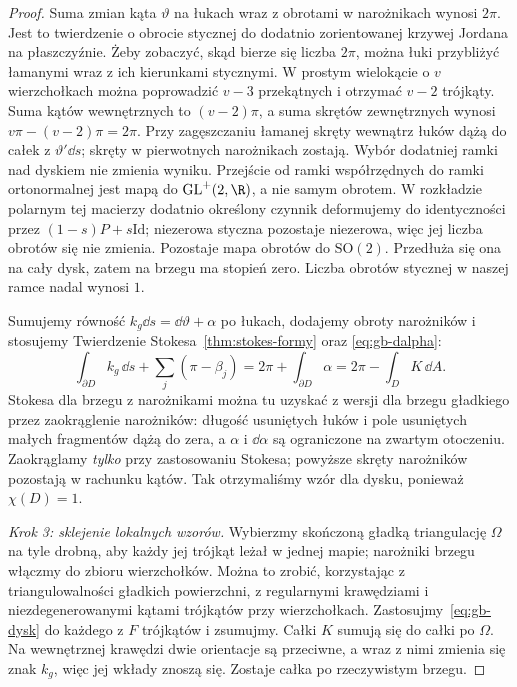 \begin{proof}
Suma zmian kąta $\vartheta$ na łukach wraz z obrotami
w narożnikach wynosi $2\pi$. Jest to twierdzenie o
obrocie stycznej do dodatnio zorientowanej krzywej
Jordana na płaszczyźnie. Żeby zobaczyć, skąd bierze się
liczba $2\pi$, można łuki przybliżyć łamanymi wraz z
ich kierunkami stycznymi. W prostym wielokącie o $v$
wierzchołkach można poprowadzić $v-3$ przekątnych
i otrzymać $v-2$ trójkąty. Suma kątów wewnętrznych
to $(v-2)\pi$, a suma skrętów zewnętrznych wynosi
$v\pi-(v-2)\pi=2\pi$. Przy zagęszczaniu łamanej skręty
wewnątrz łuków dążą do całek z $\vartheta'\dd s$;
skręty w pierwotnych narożnikach zostają. Wybór
dodatniej ramki nad dyskiem nie zmienia wyniku. Przejście
od ramki współrzędnych do ramki ortonormalnej jest mapą
do $\mathrm{GL}^+(2,\R)$, a nie samym obrotem. W rozkładzie
polarnym tej macierzy dodatnio określony czynnik deformujemy
do identyczności przez $(1-s)P+s\mathrm{Id}$; niezerowa
styczna pozostaje niezerowa, więc jej liczba obrotów się
nie zmienia. Pozostaje mapa obrotów do $\mathrm{SO}(2)$.
Przedłuża się ona na cały dysk, zatem na brzegu ma stopień
zero. Liczba obrotów stycznej w naszej ramce nadal wynosi $1$.

Sumujemy równość $k_g\dd s=\dd\vartheta+\alpha$
po łukach, dodajemy obroty narożników i stosujemy
Twierdzenie Stokesa~\ref{thm:stokes-formy} oraz
\eqref{eq:gb-dalpha}:
\begin{equation}\label{eq:gb-dysk}
 \int_{\partial D}k_g\,\dd s
 +\sum_j(\pi-\beta_j)
 =2\pi+\int_{\partial D}\alpha
 =2\pi-\int_D K\,\dd A.
\end{equation}
Stokesa dla brzegu z narożnikami można tu uzyskać
z wersji dla brzegu gładkiego przez zaokrąglenie
narożników: długość usuniętych łuków i pole usuniętych
małych fragmentów dążą do zera, a $\alpha$ i $\dd\alpha$
są ograniczone na zwartym otoczeniu. Zaokrąglamy
\emph{tylko} przy zastosowaniu Stokesa; powyższe
skręty narożników pozostają w rachunku kątów.
Tak otrzymaliśmy wzór dla dysku, ponieważ $\chi(D)=1$.

\emph{Krok 3: sklejenie lokalnych wzorów.}
Wybierzmy skończoną gładką triangulację $\Omega$ na tyle
drobną, aby każdy jej trójkąt leżał w jednej mapie;
narożniki brzegu włączmy do zbioru wierzchołków.
Można to zrobić, korzystając z triangulowalności
gładkich powierzchni, z regularnymi krawędziami i
niezdegenerowanymi kątami trójkątów przy wierzchołkach. Zastosujmy~\eqref{eq:gb-dysk}
do każdego z $F$ trójkątów i zsumujmy. Całki $K$
sumują się do całki po $\Omega$. Na wewnętrznej
krawędzi dwie orientacje są przeciwne, a wraz z nimi
zmienia się znak $k_g$, więc jej wkłady znoszą się.
Zostaje całka po rzeczywistym brzegu.


\end{proof}
